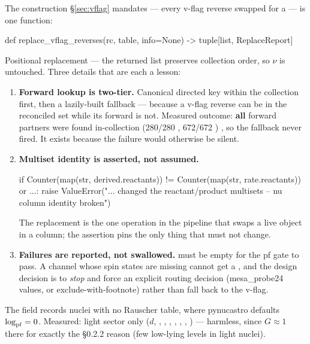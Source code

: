 The construction \S\ref{sec:vflag} mandates --- every v-flag reverse swapped for
a  --- is one function:

\begin{srclisting}
def replace_vflag_reverses(rc, table, info=None) -> tuple[list, ReplaceReport]
\end{srclisting}

Positional replacement --- the returned list preserves collection order, so
$\nu$ is untouched. Three details that are each a lesson:

\begin{enumerate}
\item \textbf{Forward lookup is two-tier.} Canonical directed key within the
      collection first, then a lazily-built
       fallback --- because a v-flag
      reverse can be in the reconciled set while its forward is not. Measured
      outcome: \textbf{all} forward partners were found in-collection (280/280
      , 672/672 ) , so the fallback
      never fired. It exists because the failure would otherwise be silent.

\item \textbf{Multiset identity is asserted, not assumed.}
      \begin{srclisting}
if Counter(map(str, derived.reactants)) != Counter(map(str, rate.reactants)) or ...:
    raise ValueError("... changed the reactant/product multisets -- nu column identity broken")
      \end{srclisting}
      The replacement is the one operation in the pipeline that swaps a live
      object in a column; the assertion pins the only thing that must not change.

\item \textbf{Failures are reported, not swallowed.} 
      must be empty for the pf gate to pass. A channel whose spin states are
      missing cannot get a , and the design decision is to
      \emph{stop} and force an explicit routing decision (mesa\_probe24 values,
      or exclude-with-footnote) rather than fall back to the v-flag.
\end{enumerate}

The  field records nuclei with no Rauscher table, where
pynucastro defaults $\log_{\rm pf} = 0$. Measured: light sector only ($d$,
, , , , ,
, )  --- harmless, since
$G \approx 1$ there for exactly the \S0.2.2 reason (few low-lying levels in
light nuclei).

